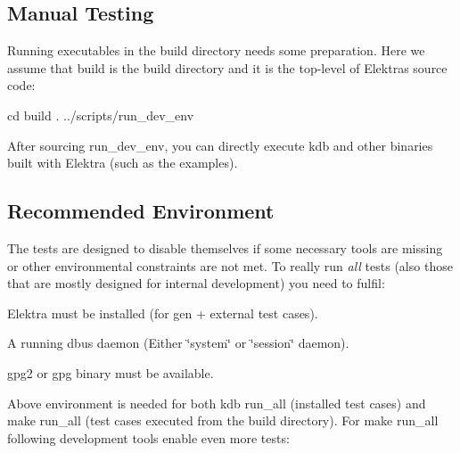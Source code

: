 \subsection*{Manual Testing}

Running executables in the build directory needs some preparation. Here we assume that {\ttfamily build} is the build directory and it is the top-\/level of Elektra\textquotesingle{}s source code\+:


\begin{DoxyCode}
cd build
. ../scripts/run\_dev\_env
\end{DoxyCode}


After sourcing {\ttfamily run\+\_\+dev\+\_\+env}, you can directly execute {\ttfamily kdb} and other binaries built with Elektra (such as the examples).

\subsection*{Recommended Environment}

The tests are designed to disable themselves if some necessary tools are missing or other environmental constraints are not met. To really run {\itshape all} tests (also those that are mostly designed for internal development) you need to fulfil\+:


\begin{DoxyItemize}
\item Elektra must be installed (for gen + external test cases).
\item A running dbus daemon (Either \char`\"{}system\char`\"{} or \char`\"{}session\char`\"{} daemon).
\item {\ttfamily gpg2} or {\ttfamily gpg} binary must be available.
\end{DoxyItemize}

Above environment is needed for both {\ttfamily kdb run\+\_\+all} (installed test cases) and {\ttfamily make run\+\_\+all} (test cases executed from the build directory). For {\ttfamily make run\+\_\+all} following development tools enable even more tests\+:


